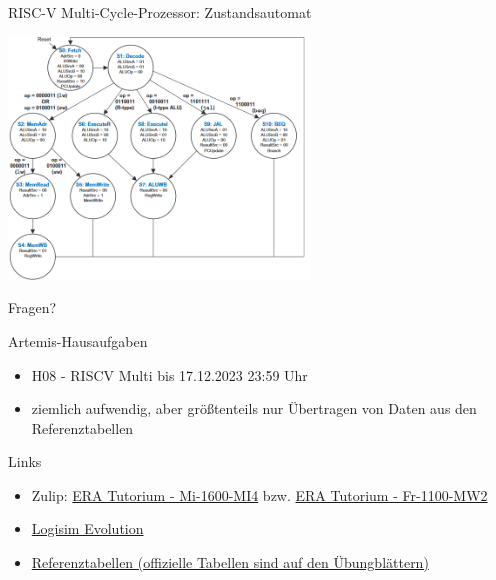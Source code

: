 \documentclass[
  german,            %
  aspectratio=169,    %
]{tumbeamer}
\begin{document}
\begin{frame}[c]{RISC-V Multi-Cycle-Prozessor: Zustandsautomat}{}
  \begin{center}
    \includegraphics[width=0.6\textwidth]{w08_multi_cycle_states.png}
  \end{center}
  \centering
\end{frame}

\begin{frame}[c]{}{}
  \begin{center}
    \LARGE Fragen?
  \end{center}
\end{frame}

\begin{frame}[c, fragile]{Artemis-Hausaufgaben}{}
  \begin{itemize}
    \item H08 - RISCV Multi bis 17.12.2023 23:59 Uhr
    \item ziemlich aufwendig, aber größtenteils nur Übertragen von Daten aus den Referenztabellen
  \end{itemize}
\end{frame}

\begin{frame}[fragile, c]{Links}{}
  \begin{itemize}
    \item Zulip: \href{https://zulip.in.tum.de/#narrow/stream/1917-ERA-Tutorium---Mi-1600-MI4}{\glqq ERA Tutorium - Mi-1600-MI4\grqq}
          bzw. \href{https://zulip.in.tum.de/#narrow/stream/1940-ERA-Tutorium---Fr-1100-MW2}{\glqq ERA Tutorium - Fr-1100-MW2\grqq}
    \item \href{https://github.com/logisim-evolution/logisim-evolution/releases}{Logisim Evolution}
    \item \href{https://courses.edx.org/assets/courseware/v1/f06a2dc0c856f60ec0711e9f5e1c98cf/asset-v1:HarveyMuddX+ENGR85B+1T2023+type@asset+block/FinalReferences.pdf}{Referenztabellen (offizielle Tabellen sind auf den Übungblättern)}
  \end{itemize}
\end{frame}

\maketitle
\end{document}
